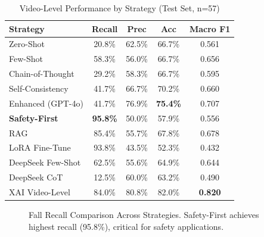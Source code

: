\documentclass[conference]{IEEEtran}
\begin{document}
\begin{table}[H]
\centering
\caption{Video-Level Performance by Strategy (Test Set, n=57)}
\label{tab:main_results}
\begin{tabular}{lcccc}
\toprule
\textbf{Strategy} & \textbf{Recall} & \textbf{Prec} & \textbf{Acc} & \textbf{Macro F1} \\
\midrule
Zero-Shot & 20.8\% & 62.5\% & 66.7\% & 0.561 \\
Few-Shot & 58.3\% & 56.0\% & 66.7\% & 0.656 \\
Chain-of-Thought & 29.2\% & 58.3\% & 66.7\% & 0.595 \\
Self-Consistency & 41.7\% & 66.7\% & 70.2\% & 0.660 \\
Enhanced (GPT-4o) & 41.7\% & 76.9\% & \textbf{75.4\%} & 0.707 \\
\textbf{Safety-First} & \textbf{95.8\%} & 50.0\% & 57.9\% & 0.556 \\
RAG & 85.4\% & 55.7\% & 67.8\% & 0.678 \\
LoRA Fine-Tune & 93.8\% & 43.5\% & 52.3\% & 0.432 \\
DeepSeek Few-Shot & 62.5\% & 55.6\% & 64.9\% & 0.644 \\
DeepSeek CoT & 12.5\% & 60.0\% & 63.2\% & 0.490 \\
XAI Video-Level & 84.0\% & 80.8\% & 82.0\% & \textbf{0.820} \\
\bottomrule
\end{tabular}
\end{table}

\begin{figure}[H]
\centering
{}
\caption{Fall Recall Comparison Across Strategies. Safety-First achieves highest recall (95.8\%), critical for safety applications.}
\label{fig:recall_comparison}
\end{figure}
\end{document}
